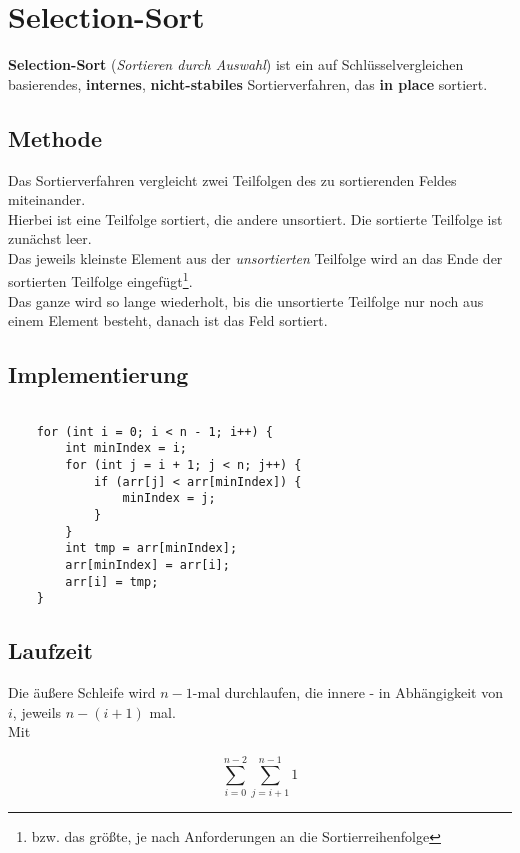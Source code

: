 \section{Selection-Sort}

\textbf{Selection-Sort} (\textit{Sortieren durch Auswahl}) ist ein auf Schlüsselvergleichen basierendes, \textbf{internes}, \textbf{nicht-stabiles} Sortierverfahren, das \textbf{in place} sortiert.

\subsection{Methode}
Das Sortierverfahren vergleicht zwei Teilfolgen des zu sortierenden Feldes miteinander.\\
Hierbei ist eine Teilfolge sortiert, die andere unsortiert.
Die sortierte Teilfolge ist zunächst leer.\\
Das jeweils kleinste Element aus der \textit{unsortierten} Teilfolge wird an das Ende der sortierten Teilfolge eingefügt\footnote{bzw. das größte, je nach Anforderungen an die Sortierreihenfolge}.\\
Das ganze wird so lange wiederholt, bis die unsortierte Teilfolge nur noch aus einem Element besteht, danach ist das Feld sortiert.


\subsection{Implementierung}

\begin{verbatim}

    for (int i = 0; i < n - 1; i++) {
        int minIndex = i;
        for (int j = i + 1; j < n; j++) {
            if (arr[j] < arr[minIndex]) {
                minIndex = j;
            }
        }
        int tmp = arr[minIndex];
        arr[minIndex] = arr[i];
        arr[i] = tmp;
    }

\end{verbatim}


\subsection{Laufzeit}
Die äußere Schleife wird $n - 1$-mal durchlaufen, die innere - in Abhängigkeit von $i$, jeweils $n - (i + 1)$ mal.\\
Mit

\begin{equation}
    \sum_{i=0}^{n-2} \sum_{j = i + 1}^{n - 1} 1
\end{equation}

